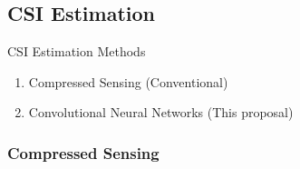 \documentclass{beamer}
\begin{document}

  \subsection{CSI Estimation}

    \begin{frame}{CSI Estimation Methods}
       \begin{enumerate}
       \item Compressed Sensing (Conventional)
       \item Convolutional Neural Networks (This proposal)
      \end{enumerate} 
    \end{frame}

  \subsubsection{Compressed Sensing}
\end{document}
